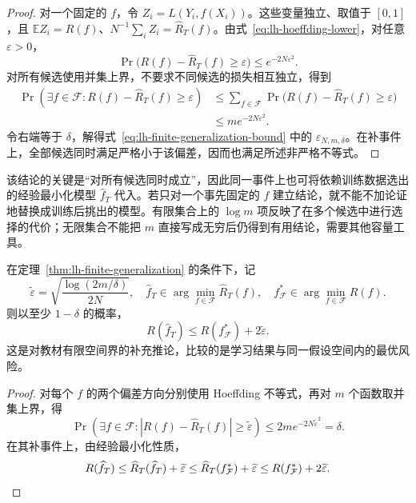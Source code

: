 \begin{proof}
对一个固定的 $f$，令 $Z_i=L(Y_i,f(X_i))$。这些变量独立、取值于 $[0,1]$，且 $\mathbb E Z_i=R(f)$、$N^{-1}\sum_iZ_i=\widehat R_T(f)$。由式~\eqref{eq:lh-hoeffding-lower}，对任意 $\varepsilon>0$，
\[
    \Pr\bigl(R(f)-\widehat R_T(f)\geq\varepsilon\bigr)
       \leq e^{-2N\varepsilon^2}.
\]
对所有候选使用并集上界，不要求不同候选的损失相互独立，得到
\begin{align*}
    \Pr\!\left(\exists f\in\mathcal F:
          R(f)-\widehat R_T(f)\geq\varepsilon\right)
    &\leq\sum_{f\in\mathcal F}
       \Pr\bigl(R(f)-\widehat R_T(f)\geq\varepsilon\bigr)\\
    &\leq m e^{-2N\varepsilon^2}.
\end{align*}
令右端等于 $\delta$，解得式~\eqref{eq:lh-finite-generalization-bound} 中的 $\varepsilon_{N,m,\delta}$。在补事件上，全部候选同时满足严格小于该偏差，因而也满足所述非严格不等式。
\end{proof}

该结论的关键是“对所有候选同时成立”，因此同一事件上也可将依赖训练数据选出的经验最小化模型 $\widehat f_T$ 代入。若只对一个事先固定的 $f$ 建立结论，就不能不加论证地替换成训练后挑出的模型。有限集合上的 $\log m$ 项反映了在多个候选中进行选择的代价；无限集合不能把 $m$ 直接写成无穷后仍得到有用结论，需要其他容量工具。

\begin{corollary}[经验风险最小化的风险比较]
\label{cor:lh-erm-risk-comparison}
在定理~\ref{thm:lh-finite-generalization} 的条件下，记
\[
    \widetilde\varepsilon
       =\sqrt{\frac{\log(2m/\delta)}{2N}},
    \quad
    \widehat f_T\in\arg\min_{f\in\mathcal F}\widehat R_T(f),
    \quad
    f_{\mathcal F}^*\in\arg\min_{f\in\mathcal F}R(f).
\]
则以至少 $1-\delta$ 的概率，
\begin{equation}
    R(\widehat f_T)\leq R(f_{\mathcal F}^*)+2\widetilde\varepsilon.
    \label{eq:lh-erm-oracle-bound}
\end{equation}
这是对教材有限空间界的补充推论，比较的是学习结果与同一假设空间内的最优风险。
\end{corollary}

\begin{proof}
对每个 $f$ 的两个偏差方向分别使用 Hoeffding 不等式，再对 $m$ 个函数取并集上界，得
\[
    \Pr\!\left(\exists f\in\mathcal F:
       |R(f)-\widehat R_T(f)|\geq\widetilde\varepsilon\right)
       \leq 2m e^{-2N\widetilde\varepsilon^2}=\delta.
\]
在其补事件上，由经验最小化性质，
\[
    R(\widehat f_T)
      \leq\widehat R_T(\widehat f_T)+\widetilde\varepsilon
      \leq\widehat R_T(f_{\mathcal F}^*)+\widetilde\varepsilon
      \leq R(f_{\mathcal F}^*)+2\widetilde\varepsilon.
      \qedhere
\]
\end{proof}

